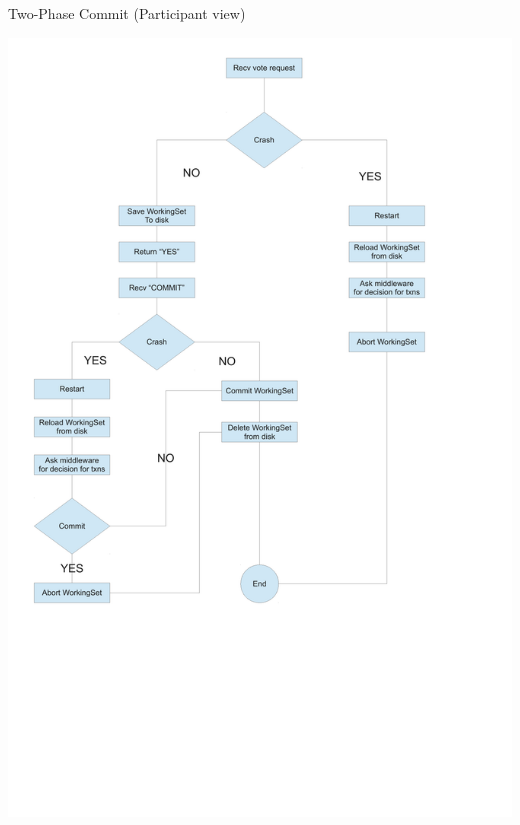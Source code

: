 \documentclass{beamer}
\begin{document}
\begin{frame}{Two-Phase Commit (Participant view)}

  \begin{center}
    \includegraphics[scale=0.25]{2pc.pdf}
  \end{center}

\end{frame}
\end{document}
